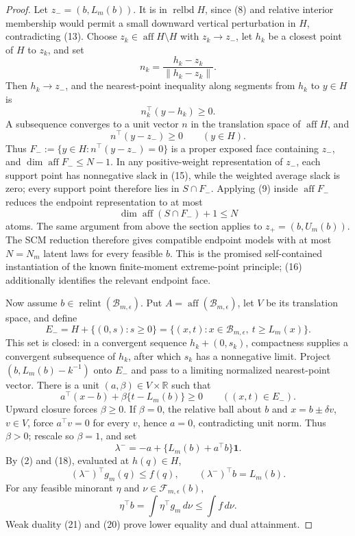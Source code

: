 \documentclass{article}
\begin{document}
\begin{proof}
Let \(z_-=(b,L_m(b))\).  It is in \(\operatorname{relbd}H\), since (8) and relative interior membership would permit a small downward vertical perturbation in \(H\), contradicting (13).  Choose \(z_k\in\operatorname{aff}H\setminus H\) with \(z_k\to z_-\), let \(h_k\) be a closest point of \(H\) to \(z_k\), and set
\[
 n_k=\frac{h_k-z_k}{\lVert h_k-z_k\rVert}.
\]
Then \(h_k\to z_-\), and the nearest-point inequality along segments from \(h_k\) to \(y\in H\) is
\[
 n_k^{\top}(y-h_k)\geq0.
\tag{14}
\]
A subsequence converges to a unit vector \(n\) in the translation space of \(\operatorname{aff}H\), and
\[
 n^{\top}(y-z_-)\geq0\qquad(y\in H).
\tag{15}
\]
Thus \(F_-:=\{y\in H:n^{\top}(y-z_-)=0\}\) is a proper exposed face containing \(z_-\), and \(\dim\operatorname{aff}F_-\leq N-1\).  In any positive-weight representation of \(z_-\), each support point has nonnegative slack in (15), while the weighted average slack is zero; every support point therefore lies in \(S\cap F_-\).  Applying (9) inside \(\operatorname{aff}F_-\) reduces the endpoint representation to at most
\[
 \dim\operatorname{aff}(S\cap F_-)+1\leq N
\tag{16}
\]
atoms.  The same argument from above the section applies to \(z_+=(b,U_m(b))\).  The SCM reduction therefore gives compatible endpoint models with at most \(N=N_m\) latent laws for every feasible \(b\).  This is the promised self-contained instantiation of the known finite-moment extreme-point principle; (16) additionally identifies the relevant endpoint face.

Now assume \(b\in\operatorname{relint}(\mathcal B_{m,\epsilon})\).  Put \(A=\operatorname{aff}(\mathcal B_{m,\epsilon})\), let \(V\) be its translation space, and define
\[
 E_-=H+\{(0,s):s\geq0\}
 =\{(x,t):x\in\mathcal B_{m,\epsilon},\ t\geq L_m(x)\}.
\tag{17}
\]
This set is closed: in a convergent sequence \(h_k+(0,s_k)\), compactness supplies a convergent subsequence of \(h_k\), after which \(s_k\) has a nonnegative limit.  Project \((b,L_m(b)-k^{-1})\) onto \(E_-\) and pass to a limiting normalized nearest-point vector.  There is a unit \((a,\beta)\in V\times\mathbb R\) such that
\[
 a^{\top}(x-b)+\beta\{t-L_m(b)\}\geq0
 \qquad((x,t)\in E_-).
\tag{18}
\]
Upward closure forces \(\beta\geq0\).  If \(\beta=0\), the relative ball about \(b\) and \(x=b\pm\delta v\), \(v\in V\), force \(a^{\top}v=0\) for every \(v\), hence \(a=0\), contradicting unit norm.  Thus \(\beta>0\); rescale so \(\beta=1\), and set
\[
 \lambda^-=-a+\{L_m(b)+a^{\top}b\}\mathbf1.
\tag{19}
\]
By (2) and (18), evaluated at \(h(q)\in H\),
\[
 (\lambda^-)^{\top}g_m(q)\leq f(q),
 \qquad (\lambda^-)^{\top}b=L_m(b).
\tag{20}
\]
For any feasible minorant \(\eta\) and \(\nu\in\mathcal F_{m,\epsilon}(b)\),
\[
 \eta^{\top}b=\int\eta^{\top}g_m\,d\nu\leq\int f\,d\nu.
\tag{21}
\]
Weak duality (21) and (20) prove lower equality and dual attainment.


\end{proof}
\end{document}

